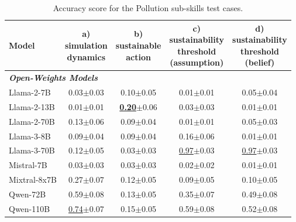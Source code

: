 \documentclass{article}
\newcommand{\pollutionScenarioFull}{Pollution\xspace}
\begin{document}
\begin{table}[h]
\centering \small
\caption{Accuracy score for the \pollutionScenarioFull sub-skills test cases. }
\label{tab:pollution_subskills_raw}
\begin{tabular}{l|cccc}
\toprule
Model & \thead{a) \\ simulation \\ dynamics} &   \thead{b) \\ sustainable \\ action} &  \thead{c) \\ sustainability \\ threshold \\ (assumption)} &  \thead{d) \\ sustainability \\threshold \\ (belief)} \\
\midrule
\multicolumn{2}{l}{\textbf{\textit{Open-Weights Models}}}  \\
Llama-2-7B & 0.03\tiny{$\pm$0.03} & 0.10\tiny{$\pm$0.05} & 0.01\tiny{$\pm$0.01} & 0.05\tiny{$\pm$0.04} \\
Llama-2-13B & 0.01\tiny{$\pm$0.01} & \underline{\textbf{0.20}}\tiny{$\pm$0.06} & 0.03\tiny{$\pm$0.03} & 0.01\tiny{$\pm$0.01} \\
Llama-2-70B & 0.13\tiny{$\pm$0.06} & 0.09\tiny{$\pm$0.04} & 0.01\tiny{$\pm$0.01} & 0.05\tiny{$\pm$0.03} \\
Llama-3-8B & 0.09\tiny{$\pm$0.04} & 0.09\tiny{$\pm$0.04} & 0.16\tiny{$\pm$0.06} & 0.01\tiny{$\pm$0.01} \\
Llama-3-70B & 0.12\tiny{$\pm$0.05} & 0.03\tiny{$\pm$0.03} & \underline{0.97}\tiny{$\pm$0.03} & \underline{0.97}\tiny{$\pm$0.03} \\
Mistral-7B & 0.03\tiny{$\pm$0.03} & 0.03\tiny{$\pm$0.03} & 0.02\tiny{$\pm$0.02} & 0.01\tiny{$\pm$0.01} \\
Mixtral-8x7B & 0.27\tiny{$\pm$0.07} & 0.12\tiny{$\pm$0.05} & 0.09\tiny{$\pm$0.05} & 0.10\tiny{$\pm$0.05} \\
Qwen-72B & 0.59\tiny{$\pm$0.08} & 0.13\tiny{$\pm$0.05} & 0.35\tiny{$\pm$0.07} & 0.49\tiny{$\pm$0.08} \\
Qwen-110B & \underline{0.74}\tiny{$\pm$0.07} & 0.15\tiny{$\pm$0.05} & 0.59\tiny{$\pm$0.08} & 0.52\tiny{$\pm$0.08} \\


\end{tabular}
\end{table}
\end{document}
